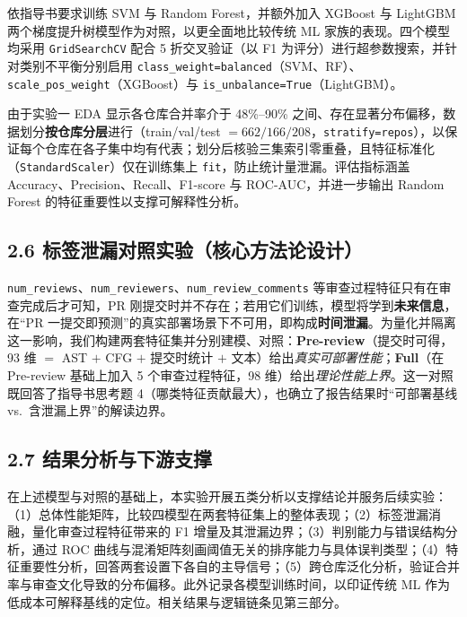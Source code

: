 \documentclass{experimentreport}
\begin{document}
{依指导书要求训练 SVM 与 Random Forest，并额外加入 XGBoost 与 LightGBM 两个梯度提升树模型作为对照，以更全面地比较传统 ML 家族的表现。四个模型均采用 \texttt{GridSearchCV} 配合 5 折交叉验证（以 F1 为评分）进行超参数搜索，并针对类别不平衡分别启用 \texttt{class\_weight=balanced}（SVM、RF）、\texttt{scale\_pos\_weight}（XGBoost）与 \texttt{is\_unbalance=True}（LightGBM）。

由于实验一 EDA 显示各仓库合并率介于 48\%--90\% 之间、存在显著分布偏移，数据划分\textbf{按仓库分层}进行（train/val/test $=662/166/208$，\texttt{stratify=repos}），以保证每个仓库在各子集中均有代表；划分后核验三集索引零重叠，且特征标准化（\texttt{StandardScaler}）仅在训练集上 \texttt{fit}，防止统计量泄漏。评估指标涵盖 Accuracy、Precision、Recall、F1-score 与 ROC-AUC，并进一步输出 Random Forest 的特征重要性以支撑可解释性分析。

\subsection*{2.6 标签泄漏对照实验（核心方法论设计）}

\texttt{num\_reviews}、\texttt{num\_reviewers}、\texttt{num\_review\_comments} 等审查过程特征只有在审查完成后才可知，PR 刚提交时并不存在；若用它们训练，模型将学到\textbf{未来信息}，在“PR 一提交即预测”的真实部署场景下不可用，即构成\textbf{时间泄漏}。为量化并隔离这一影响，我们构建两套特征集并分别建模、对照：\textbf{Pre-review}（提交时可得，93 维 $=$ AST $+$ CFG $+$ 提交时统计 $+$ 文本）给出\emph{真实可部署性能}；\textbf{Full}（在 Pre-review 基础上加入 5 个审查过程特征，98 维）给出\emph{理论性能上界}。这一对照既回答了指导书思考题 4（哪类特征贡献最大），也确立了报告结果时“可部署基线 vs.\ 含泄漏上界”的解读边界。

\subsection*{2.7 结果分析与下游支撑}

在上述模型与对照的基础上，本实验开展五类分析以支撑结论并服务后续实验：（1）总体性能矩阵，比较四模型在两套特征集上的整体表现；（2）标签泄漏消融，量化审查过程特征带来的 F1 增量及其泄漏边界；（3）判别能力与错误结构分析，通过 ROC 曲线与混淆矩阵刻画阈值无关的排序能力与具体误判类型；（4）特征重要性分析，回答两套设置下各自的主导信号；（5）跨仓库泛化分析，验证合并率与审查文化导致的分布偏移。此外记录各模型训练时间，以印证传统 ML 作为低成本可解释基线的定位。相关结果与逻辑链条见第三部分。

}

\end{document}

